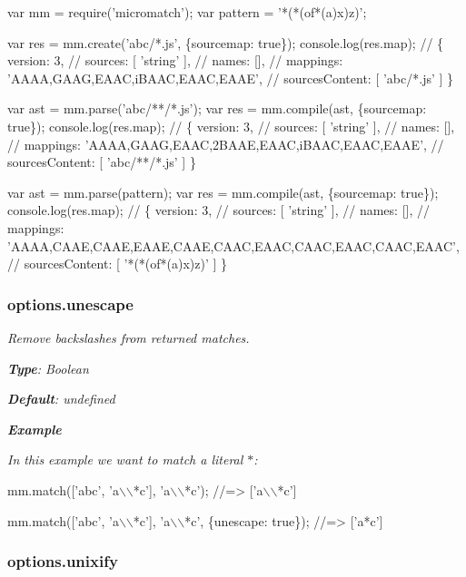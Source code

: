 {\itshape 
\begin{DoxyCode}
var mm = require('micromatch');
var pattern = '*(*(of*(a)x)z)';

var res = mm.create('abc/*.js', \{sourcemap: true\});
console.log(res.map);
// \{ version: 3,
//   sources: [ 'string' ],
//   names: [],
//   mappings: 'AAAA,GAAG,EAAC,iBAAC,EAAC,EAAE',
//   sourcesContent: [ 'abc/*.js' ] \}

var ast = mm.parse('abc/**/*.js');
var res = mm.compile(ast, \{sourcemap: true\});
console.log(res.map);
// \{ version: 3,
//   sources: [ 'string' ],
//   names: [],
//   mappings: 'AAAA,GAAG,EAAC,2BAAE,EAAC,iBAAC,EAAC,EAAE',
//   sourcesContent: [ 'abc/**/*.js' ] \}

var ast = mm.parse(pattern);
var res = mm.compile(ast, \{sourcemap: true\});
console.log(res.map);
// \{ version: 3,
//   sources: [ 'string' ],
//   names: [],
//   mappings: 'AAAA,CAAE,CAAE,EAAE,CAAE,CAAC,EAAC,CAAC,EAAC,CAAC,EAAC',
//   sourcesContent: [ '*(*(of*(a)x)z)' ] \}
\end{DoxyCode}
}

{\itshape \subsubsection*{options.\+unescape}}

{\itshape }

{\itshape Remove backslashes from returned matches.}

{\itshape {\bfseries Type}\+: {\ttfamily Boolean}}

{\itshape {\bfseries Default}\+: {\ttfamily undefined}}

{\itshape {\bfseries Example}}

{\itshape In this example we want to match a literal {\ttfamily $\ast$}\+:}

{\itshape 
\begin{DoxyCode}
mm.match(['abc', 'a\(\backslash\)\(\backslash\)*c'], 'a\(\backslash\)\(\backslash\)*c');
//=> ['a\(\backslash\)\(\backslash\)*c']

mm.match(['abc', 'a\(\backslash\)\(\backslash\)*c'], 'a\(\backslash\)\(\backslash\)*c', \{unescape: true\});
//=> ['a*c']
\end{DoxyCode}
}

{\itshape \subsubsection*{options.\+unixify}}

